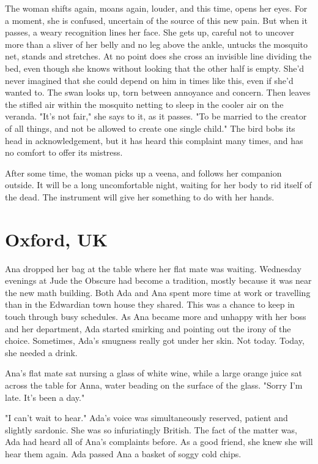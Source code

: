 \documentclass{article}
\begin{document}
The woman shifts again, moans again, louder, and this time, opens her eyes. For a moment, she is confused, uncertain of the source of this new pain. But when it passes, a weary recognition lines her face. She gets up, careful not to uncover more than a sliver of her belly and no leg above the ankle, untucks the mosquito net, stands and stretches. At no point does she cross an invisible line dividing the bed, even though she knows without looking that the other half is empty. She'd never imagined that she could depend on him in times like this, even if she'd wanted to. The swan looks up, torn between annoyance and concern. Then leaves the stifled air within the mosquito netting to sleep in the cooler air on the veranda. "It’s not fair," she says to it, as it passes. "To be married to the creator of all things, and not be allowed to create one single child." The bird bobs its head in acknowledgement, but it has heard this complaint many times, and has no comfort to offer its mistress. 

After some time, the woman picks up a veena, and follows her companion outside. It will be a long uncomfortable night, waiting for her body to rid itself of the dead. The instrument will give her something to do with her hands.

\section{Oxford, UK}

Ana dropped her bag at the table where her flat mate was waiting. Wednesday evenings at Jude the Obscure had become a tradition, mostly because it was near the new math building. Both Ada and Ana spent more time at work or travelling than in the Edwardian town house they shared. This was a chance to keep in touch through busy schedules. As Ana became more and unhappy with her boss and her department, Ada started smirking and pointing out the irony of the choice. Sometimes, Ada’s smugness really got under her skin. Not today. Today, she needed a drink.

Ana’s flat mate sat nursing a glass of white wine, while a large orange juice sat across the table for Anna, water beading on the surface of the glass. "Sorry I'm late. It’s been a day."

"I can't wait to hear." Ada's voice was simultaneously reserved, patient and slightly sardonic. She was so infuriatingly British. The fact of the matter was, Ada had heard all of Ana’s complaints before. As a good friend, she knew she will hear them again. Ada passed Ana a basket of soggy cold chips. 
\end{document}
